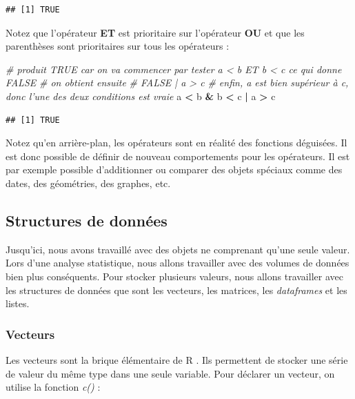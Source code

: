 \documentclass[
  11pt,
  french,
]{book}
\makeatletter
\newenvironment{Shaded}{\begin{snugshade}}{\end{snugshade}}
\newcommand{\CommentTok}[1]{\textcolor[rgb]{0.56,0.35,0.01}{\textit{#1}}}
\newcommand{\NormalTok}[1]{#1}
\newcommand{\OperatorTok}[1]{\textcolor[rgb]{0.81,0.36,0.00}{\textbf{#1}}}
\newcommand{\StringTok}[1]{\textcolor[rgb]{0.31,0.60,0.02}{#1}}
\newenvironment{kframe}{%
\medskip{}
\setlength{\fboxsep}{.8em}
 \def\at@end@of@kframe{}%
 \ifinner\ifhmode%
  \def\at@end@of@kframe{\end{minipage}}%
  \begin{minipage}{\columnwidth}%
 \fi\fi%
 \def\FrameCommand##1{\hskip\@totalleftmargin \hskip-\fboxsep
 \colorbox{shadecolor}{##1}\hskip-\fboxsep
     \hskip-\linewidth \hskip-\@totalleftmargin \hskip\columnwidth}%
 \MakeFramed {\advance\hsize-\width
   \@totalleftmargin\z@ \linewidth\hsize
   \@setminipage}}%
 {\par\unskip\endMakeFramed%
 \at@end@of@kframe}
\renewenvironment{Shaded}{\begin{kframe}}{\end{kframe}}
\makeatother
\begin{document}
\begin{verbatim}
## [1] TRUE
\end{verbatim}

Notez que l'opérateur \textbf{ET} est prioritaire sur l'opérateur \textbf{OU} et que les parenthèses sont prioritaires sur tous les opérateurs :

\begin{Shaded}
\begin{Highlighting}[]
\CommentTok{# produit TRUE car on va commencer par tester a < b ET b < c ce qui donne FALSE}
\CommentTok{# on obtient ensuite}
\CommentTok{# FALSE |  a > c}
\CommentTok{# enfin, a est bien supérieur à c, donc l'une des deux conditions est vraie}
\NormalTok{a }\OperatorTok{<}\StringTok{ }\NormalTok{b }\OperatorTok{&}\StringTok{ }\NormalTok{b }\OperatorTok{<}\StringTok{ }\NormalTok{c }\OperatorTok{|}\StringTok{  }\NormalTok{a }\OperatorTok{>}\StringTok{ }\NormalTok{c}
\end{Highlighting}
\end{Shaded}

\begin{verbatim}
## [1] TRUE
\end{verbatim}

Notez qu'en arrière-plan, les opérateurs sont en réalité des fonctions déguisées. Il est donc possible de définir de nouveau comportements pour les opérateurs. Il est par exemple possible d'additionner ou comparer des objets spéciaux comme des dates, des géométries, des graphes, etc.

\hypertarget{sect0136}{%
\subsection{Structures de données}\label{sect0136}}

Jusqu'ici, nous avons travaillé avec des objets ne comprenant qu'une seule valeur. Lors d'une analyse statistique, nous allons travailler avec des volumes de données bien plus conséquents. Pour stocker plusieurs valeurs, nous allons travailler avec les structures de données que sont les vecteurs, les matrices, les \emph{dataframes} et les listes.

\hypertarget{sect01361}{%
\subsubsection{Vecteurs}\label{sect01361}}

Les vecteurs sont la brique élémentaire de R . Ils permettent de stocker une série de valeur du même type dans une seule variable. Pour déclarer un vecteur, on utilise la fonction \emph{c()} :
\end{document}
